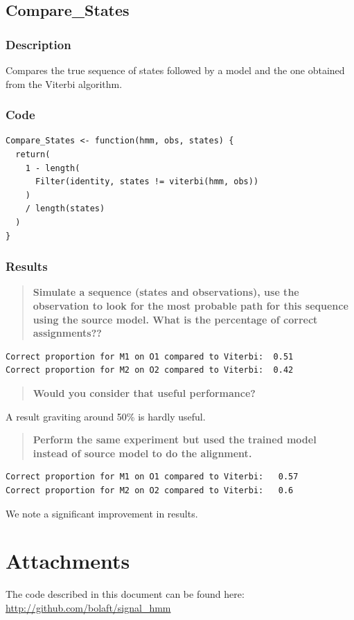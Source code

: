 \documentclass[a4paper]{article}
\begin{document}
\subsection{Compare\_States}

\subsubsection{Description}
Compares the true sequence of states followed by a model and the one obtained from the Viterbi algorithm.

\subsubsection{Code}

\begin{lstlisting}
Compare_States <- function(hmm, obs, states) {
  return(
    1 - length(
      Filter(identity, states != viterbi(hmm, obs))
    )
    / length(states)
  )
}
\end{lstlisting}

\subsubsection{Results}

\begin{quotation}
\textbf{Simulate a sequence (states and observations), use the observation to look for the most
probable path for this sequence using the source model. What is the percentage of correct assignments??}
\end{quotation}

\begin{lstlisting}
Correct proportion for M1 on O1 compared to Viterbi:  0.51 
Correct proportion for M2 on O2 compared to Viterbi:  0.42 
\end{lstlisting}

\begin{quotation}
\textbf{Would you consider that useful performance?}
\end{quotation}

A result graviting around 50\% is hardly useful.

\begin{quotation}
\textbf{Perform the same experiment but used the trained model instead of source model to do the alignment.}
\end{quotation}

\begin{lstlisting}
Correct proportion for M1 on O1 compared to Viterbi:   0.57 
Correct proportion for M2 on O2 compared to Viterbi:   0.6 
\end{lstlisting}

We note a significant improvement in results.

\section{Attachments}

The code described in this document can be found here: \url{http://github.com/bolaft/signal_hmm}
\end{document}
